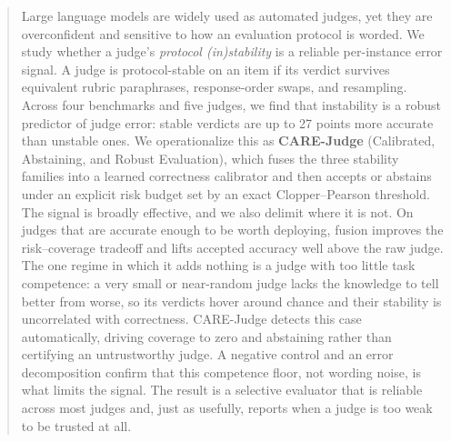 
\begin{abstract}
Large language models are widely used as automated judges, yet they are overconfident and sensitive to how an evaluation protocol is worded. We study whether a judge's \emph{protocol (in)stability} is a reliable per-instance error signal. A judge is protocol-stable on an item if its verdict survives equivalent rubric paraphrases, response-order swaps, and resampling. Across four benchmarks and five judges, we find that instability is a robust predictor of judge error: stable verdicts are up to 27 points more accurate than unstable ones. We operationalize this as \textbf{CARE-Judge} (Calibrated, Abstaining, and Robust Evaluation), which fuses the three stability families into a learned correctness calibrator and then accepts or abstains under an explicit risk budget set by an exact Clopper--Pearson threshold. The signal is broadly effective, and we also delimit where it is not. On judges that are accurate enough to be worth deploying, fusion improves the risk--coverage tradeoff and lifts accepted accuracy well above the raw judge. The one regime in which it adds nothing is a judge with too little task competence: a very small or near-random judge lacks the knowledge to tell better from worse, so its verdicts hover around chance and their stability is uncorrelated with correctness. CARE-Judge detects this case automatically, driving coverage to zero and abstaining rather than certifying an untrustworthy judge. A negative control and an error decomposition confirm that this competence floor, not wording noise, is what limits the signal. The result is a selective evaluator that is reliable across most judges and, just as usefully, reports when a judge is too weak to be trusted at all.
\end{abstract}
